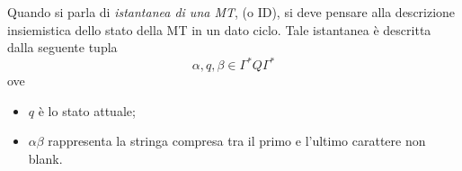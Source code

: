 \documentclass{subfiles}
\begin{document}
Quando si parla di \emph{istantanea di una MT}, (o ID), si deve pensare alla descrizione insiemistica dello stato della MT in un dato ciclo.
Tale istantanea è descritta dalla seguente tupla
\[
    \alpha, q, \beta \in \Gamma^{*} Q \Gamma^{*}
\]
ove
\begin{itemize}
    \item \(q\) è lo stato attuale;
    \item \(\alpha \beta\) rappresenta la stringa compresa tra il primo e l'ultimo carattere non blank.
\end{itemize}
\end{document}
